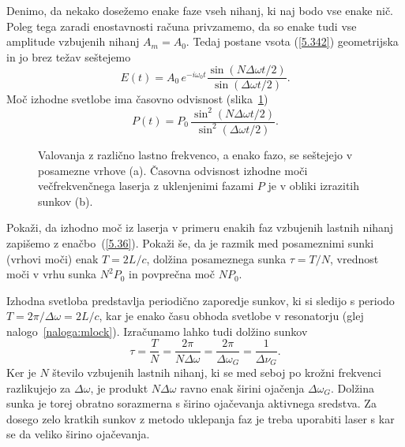 Denimo, da nekako dosežemo enake faze vseh nihanj, ki naj bodo vse enake nič. 
Poleg tega zaradi enostavnosti
računa privzamemo, da so enake tudi vse amplitude vzbujenih nihanj $A_{m}= A_0$. Tedaj
postane vsota (\ref{5.342}) geometrijska in jo brez težav seštejemo 
\begin{equation}
E(t)=A_{0}\,e^{-i\omega _{0}t}\frac{\sin (N\Delta \omega t/2)}{\sin(\Delta
\omega t/2)}.
\label{5.352}
\end{equation}
Moč izhodne svetlobe ima časovno odvisnost (slika~\ref{s5.10})
\begin{equation}
P(t)=P_{0}\,\frac{\sin ^{2}(N\Delta \omega t/2)}{\sin ^{2}(\Delta \omega t/2)}.
\label{5.36}
\end{equation}

\begin{figure}[ht]
\centering
\def\svgwidth{128truemm} 

\caption{Valovanja z različno lastno frekvenco, a enako fazo, se seštejejo v 
posamezne vrhove (a). 
Časovna odvisnost izhodne moči večfrekvenčnega laserja z uklenjenimi fazami $P$ je 
v obliki izrazitih sunkov (b).}
\label{s5.10}
\end{figure}

\begin{naloga}
\label{naloga:mlock}
Pokaži, da izhodno moč iz laserja v primeru enakih faz vzbujenih lastnih nihanj
zapišemo z enačbo~(\ref{5.36}). Pokaži še, da je razmik med posameznimi sunki (vrhovi
moči) enak $T=2L/c$, dolžina posameznega sunka $\tau = T/N$, vrednost moči v vrhu 
sunka $N^{2}P_{0}$ in povprečna moč $NP_{0}$.
\end{naloga}

Izhodna svetloba predstavlja periodično zaporedje sunkov, 
ki si sledijo s periodo $T=2\pi /\Delta \omega =2L/c$, kar je enako času obhoda
svetlobe v resonatorju (glej nalogo~\ref{naloga:mlock}).  Izračunamo lahko tudi 
dolžino sunkov
\begin{equation}
\tau=\frac{T}{N}=\frac{2\pi }{N\Delta \omega }=\frac{2\pi }{\Delta\omega_{G}} = 
\frac{1}{\Delta\nu_{G}}.
\label{5.37}
\end{equation}
Ker je $N$ število vzbujenih lastnih nihanj, ki se med seboj po krožni 
frekvenci razlikujejo za $\Delta \omega$, je produkt $N\Delta \omega$ ravno enak
širini ojačenja $\Delta \omega_{G}$. Dolžina sunka je torej obratno sorazmerna s širino
ojačevanja aktivnega sredstva. Za dosego zelo kratkih sunkov z metodo uklepanja
faz je treba uporabiti laser s kar se da veliko širino ojačevanja. 

